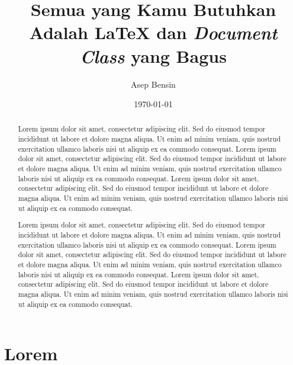 \documentclass{skripsi}
\title[
en={All You Need Is LaTeX and A Nice Document Class}, 
id={Semua yang Kamu Butuhkan Adalah LaTeX dan \textit{Document Class} yang Bagus}
]{Semua yang Kamu Butuhkan Adalah LaTeX dan \textit{Document Class} yang Bagus}
\author[1234567890]{Asep Bensin}
\date{\today}
\begin{document}
\frontmatter
\maketitle
\approvalpage
\originalitystatement
\onehalfspacing
\tableofcontents
\listoffigures
\listoftables
\begin{abstract}
    \noindent Lorem ipsum dolor sit amet, consectetur adipiscing elit. Sed do eiusmod tempor incididunt ut labore et dolore magna aliqua. Ut enim ad minim veniam, quis nostrud exercitation ullamco laboris nisi ut aliquip ex ea commodo consequat. Lorem ipsum dolor sit amet, consectetur adipiscing elit. Sed do eiusmod tempor incididunt ut labore et dolore magna aliqua. Ut enim ad minim veniam, quis nostrud exercitation ullamco laboris nisi ut aliquip ex ea commodo consequat. Lorem ipsum dolor sit amet, consectetur adipiscing elit. Sed do eiusmod tempor incididunt ut labore et dolore magna aliqua. Ut enim ad minim veniam, quis nostrud exercitation ullamco laboris nisi ut aliquip ex ea commodo consequat. \par
\end{abstract}%
\begin{otherlanguage}{english}
    \begin{itshape}
        \begin{abstract}
            \noindent Lorem ipsum dolor sit amet, consectetur adipiscing elit. Sed do eiusmod tempor incididunt ut labore et dolore magna aliqua. Ut enim ad minim veniam, quis nostrud exercitation ullamco laboris nisi ut aliquip ex ea commodo consequat. Lorem ipsum dolor sit amet, consectetur adipiscing elit. Sed do eiusmod tempor incididunt ut labore et dolore magna aliqua. Ut enim ad minim veniam, quis nostrud exercitation ullamco laboris nisi ut aliquip ex ea commodo consequat. Lorem ipsum dolor sit amet, consectetur adipiscing elit. Sed do eiusmod tempor incididunt ut labore et dolore magna aliqua. Ut enim ad minim veniam, quis nostrud exercitation ullamco laboris nisi ut aliquip ex ea commodo consequat. \par
        \end{abstract}%
    \end{itshape}
\end{otherlanguage}
\mainmatter
\onehalfspacing
\chapter{Lorem}
\end{document}
